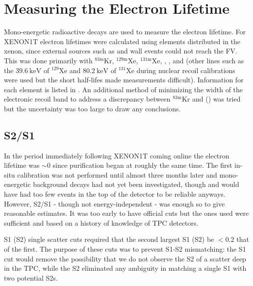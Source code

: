 \section{Measuring the Electron Lifetime}
\label{sec:electron_lifetime_measurements}
Mono-energetic radioactive decays are used to measure the electron lifetime.  For XENON1T electron lifetimes were calculated
using elements distributed in the xenon, since external \gammaray sources such as  and
wall events could not reach the FV.  This was done primarily with $\mathrm{^{83m}Kr}$, $\mathrm{^{129m}Xe}$, $\mathrm{^{131m}Xe}$,
, , and  (other lines such as the $39.6\ \mathrm{keV}$ of $\mathrm{^{129}Xe}$ and
$80.2\ \mathrm{keV}$ of $\mathrm{^{131}Xe}$ during nuclear recoil calibrations were used but the short half-lifes made measurements
difficult).  Information for each element is listed in .  An
additional method of minimizing the \stwob width of the
 electronic recoil band to address a discrepancy between
$\mathrm{^{83m}Kr}$ and \alphadecays () was tried but the uncertainty was too large to
draw any conclusions.



\subsection{S2/S1}
\label{subsec:electron_lifetimes_measurement_ss}
In the period immediately following XENON1T coming online the electron lifetime was ${\sim} 0$ since purification began at roughly
the same time.  The first in-situ calibration was not performed until almost three months later and mono-energetic
background decays had not yet been investigated, though  and  would have had too few events in the top of the
detector to be reliable anyways.  However,
S2/S1 - though not energy-independent - was enough so to give reasonable estimates.  It was too early to have official cuts but
the ones used were sufficient and based on a history of knowledge of TPC detectors.

S1 (S2) single scatter cuts required that the second largest S1 (S2) be $< 0.2$ that of the first.  The purpose of these cuts was to
prevent S1-S2 mismatching: the S1 cut would
remove the possibility that we do not observe the S2 of a scatter deep in the TPC, while the S2 eliminated any ambiguity in matching a
single S1 with two potential S2s.

